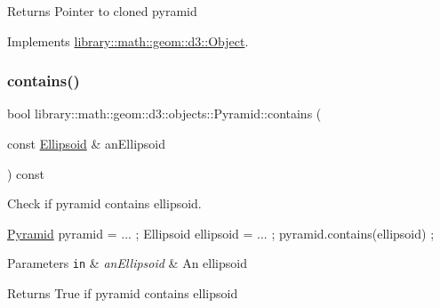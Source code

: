 \begin{DoxyReturn}{Returns}
Pointer to cloned pyramid 
\end{DoxyReturn}


Implements \hyperlink{classlibrary_1_1math_1_1geom_1_1d3_1_1_object_a1a784c6b359e0eb97cd34fabc42f2f3f}{library\+::math\+::geom\+::d3\+::\+Object}.

\mbox{\label{classlibrary_1_1math_1_1geom_1_1d3_1_1objects_1_1_pyramid_a32e8fd53701cd4d2c0c6b377ca7902c9}} 
\subsubsection{\texorpdfstring{contains()}{contains()}}
{\footnotesize\ttfamily bool library\+::math\+::geom\+::d3\+::objects\+::\+Pyramid\+::contains (\begin{DoxyParamCaption}\item[{const \hyperlink{classlibrary_1_1math_1_1geom_1_1d3_1_1objects_1_1_ellipsoid}{Ellipsoid} \&}]{an\+Ellipsoid }\end{DoxyParamCaption}) const}



Check if pyramid contains ellipsoid. 


\begin{DoxyCode}
\hyperlink{classlibrary_1_1math_1_1geom_1_1d3_1_1objects_1_1_pyramid_aafaaeed187584040b306b7de7ee57fd4}{Pyramid} pyramid = ... ;
Ellipsoid ellipsoid = ... ;
pyramid.contains(ellipsoid) ;
\end{DoxyCode}



\begin{DoxyParams}[1]{Parameters}
\mbox{\tt in}  & {\em an\+Ellipsoid} & An ellipsoid \\
\hline
\end{DoxyParams}
\begin{DoxyReturn}{Returns}
True if pyramid contains ellipsoid 
\end{DoxyReturn}
\mbox{\label{classlibrary_1_1math_1_1geom_1_1d3_1_1objects_1_1_pyramid_af24d52592c3154d633f694411d11396c}} 
